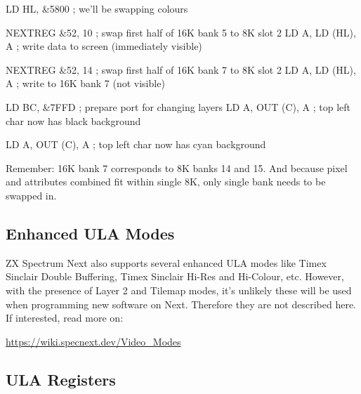 \begin{tcblisting}{}
	LD HL, &5800        ; we'll be swapping colours

	NEXTREG &52, 10     ; swap first half of 16K bank 5 to 8K slot 2
	LD A, %
	LD (HL), A          ; write data to screen (immediately visible)
	
	NEXTREG &52, 14     ; swap first half of 16K bank 7 to 8K slot 2
	LD A, %
	LD (HL), A          ; write to 16K bank 7 (not visible)
	
	LD BC, &7FFD        ; prepare port for changing layers
	LD A, %
	OUT (C), A          ; top left char now has black background
	
	LD A, %
	OUT (C), A          ; top left char now has cyan background
\end{tcblisting}

Remember: 16K bank 7 corresponds to 8K banks 14 and 15. And because pixel and attributes combined fit within single 8K, only single bank needs to be swapped in.

\subsection{Enhanced ULA Modes}

ZX Spectrum Next also supports several enhanced ULA modes like Timex Sinclair Double Buffering, Timex Sinclair Hi-Res and Hi-Colour, etc. However, with the presence of Layer 2 and Tilemap modes, it's unlikely these will be used when programming new software on Next. Therefore they are not described here. If interested, read more on:

\url{https://wiki.specnext.dev/Video_Modes}


\subsection{ULA Registers}
\label{zx_next_ula_registers}

\subsubsection{}

\begin{NextPort}
\end{NextPort}


